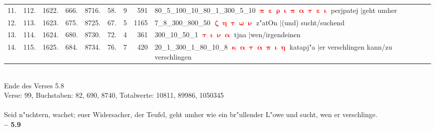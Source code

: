 \documentclass[a4paper,10pt,landscape]{article}
\begin{document}
\begin{tabular}{rrrrrrrrp{120mm}}
11.&112.&1622.&666.&8716.&58.&9&591&80\_5\_100\_10\_80\_1\_300\_5\_10 \textcolor{red}{$\boldsymbol{\uppi\upepsilon\uprho\upiota\uppi\upalpha\uptau\upepsilon\upiota}$} perjpatej $|$geht umher\\
12.&113.&1623.&675.&8725.&67.&5&1165&7\_8\_300\_800\_50 \textcolor{red}{$\boldsymbol{\upzeta\upeta\uptau\upomega\upnu}$} z"atOn $|$(und) sucht/suchend\\
13.&114.&1624.&680.&8730.&72.&4&361&300\_10\_50\_1 \textcolor{red}{$\boldsymbol{\uptau\upiota\upnu\upalpha}$} tjna $|$wen/irgendeinen\\
14.&115.&1625.&684.&8734.&76.&7&420&20\_1\_300\_1\_80\_10\_8 \textcolor{red}{$\boldsymbol{\upkappa\upalpha\uptau\upalpha\uppi\upiota\upeta}$} katapj"a $|$er verschlingen kann/zu verschlingen\\
\end{tabular}\medskip \\
Ende des Verses 5.8\\
Verse: 99, Buchstaben: 82, 690, 8740, Totalwerte: 10811, 89986, 1050345\\
\\
Seid n"uchtern, wachet; euer Widersacher, der Teufel, geht umher wie ein br"ullender L"owe und sucht, wen er verschlinge.\\
\newpage 
{\bf -- 5.9}\\
\medskip \\
\end{document}
